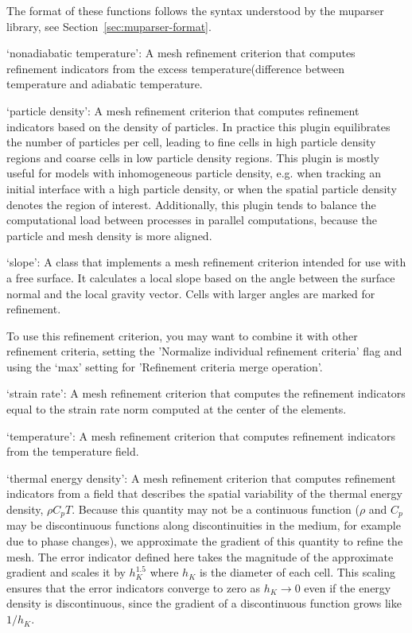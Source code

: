 \begin{itemize}
The format of these functions follows the syntax understood by the muparser library, see Section~\ref{sec:muparser-format}.

`nonadiabatic temperature': A mesh refinement criterion that computes refinement indicators from the excess temperature(difference between temperature and adiabatic temperature.

`particle density': A mesh refinement criterion that computes refinement indicators based on the density of particles. In practice this plugin equilibrates the number of particles per cell, leading to fine cells in high particle density regions and coarse cells in low particle density regions. This plugin is mostly useful for models with inhomogeneous particle density, e.g. when tracking an initial interface with a high particle density, or when the spatial particle density denotes the region of interest. Additionally, this plugin tends to balance the computational load between processes in parallel computations, because the particle and mesh density is more aligned.

`slope': A class that implements a mesh refinement criterion intended for use with a free surface. It calculates a local slope based on the angle between the surface normal and the local gravity vector. Cells with larger angles are marked for refinement.

To use this refinement criterion, you may want to combine it with other refinement criteria, setting the 'Normalize individual refinement criteria' flag and using the `max' setting for 'Refinement criteria merge operation'.

`strain rate': A mesh refinement criterion that computes the refinement indicators equal to the strain rate norm computed at the center of the elements.

`temperature': A mesh refinement criterion that computes refinement indicators from the temperature field.

`thermal energy density': A mesh refinement criterion that computes refinement indicators from a field that describes the spatial variability of the thermal energy density, $\rho C_p T$. Because this quantity may not be a continuous function ($\rho$ and $C_p$ may be discontinuous functions along discontinuities in the medium, for example due to phase changes), we approximate the gradient of this quantity to refine the mesh. The error indicator defined here takes the magnitude of the approximate gradient and scales it by $h_K^{1.5}$ where $h_K$ is the diameter of each cell. This scaling ensures that the error indicators converge to zero as $h_K\rightarrow 0$ even if the energy density is discontinuous, since the gradient of a discontinuous function grows like $1/h_K$.


\end{itemize}
